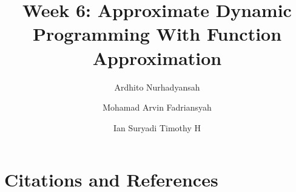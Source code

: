 \documentclass{article}
\title{Week 6: Approximate Dynamic Programming With Function Approximation}
\author[1]{Ardhito Nurhadyansah}
\author[2]{Mohamad Arvin Fadriansyah}
\author[3]{Ian Suryadi Timothy H}
\affil[1]{2106750206}
\affil[2]{2006596996}
\affil[3]{2106750875}
\begin{document}
\maketitle







































\section{Citations and References}



\end{document}
